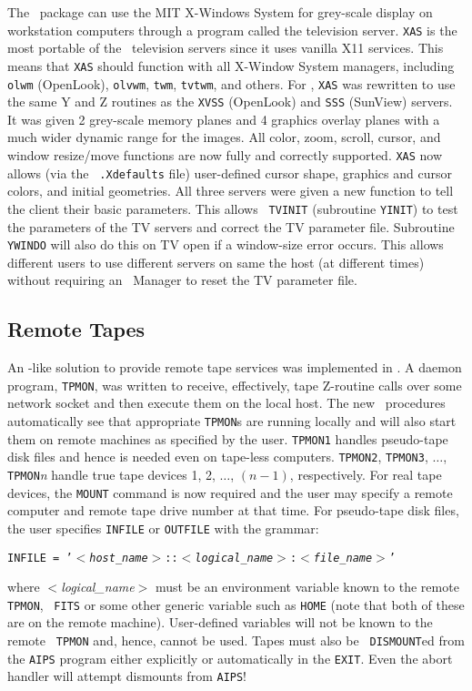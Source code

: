 The \AIPS\ package can use the MIT X-Windows System for grey-scale
display on workstation computers through a program called the
television server.  {\tt XAS} is the most portable of the \AIPS\
television servers since it uses vanilla X11 services.  This means
that {\tt XAS} should function with all X-Window System managers,
including {\tt olwm} (OpenLook), {\tt olvwm}, {\tt twm}, {\tt tvtwm},
and others.  For \RELEASENAME, {\tt XAS} was rewritten to use the same
Y and Z routines as the {\tt XVSS} (OpenLook) and {\tt SSS} (SunView)
servers.  It was given 2 grey-scale memory planes and 4 graphics
overlay planes with a much wider dynamic range for the images.  All
color, zoom, scroll, cursor, and window resize/move functions are now
fully and correctly supported.  {\tt XAS} now allows (via the {\tt
.Xdefaults} file) user-defined cursor shape, graphics and cursor
colors, and initial geometries.  All three servers were given a new
function to tell the client their basic parameters.  This allows {\tt
TVINIT} (subroutine {\tt YINIT}) to test the parameters of the TV
servers and correct the TV parameter file.  Subroutine {\tt YWINDO}
will also do this on TV open if a window-size error occurs.  This
allows different users to use different servers on same the host (at
different times) without requiring an \AIPS\ Manager to reset the
TV parameter file.

\subsection{Remote Tapes}
An \AIPS-like solution to provide remote tape services was implemented
in \RELEASENAME.  A daemon program, {\tt TPMON}, was written to
receive, effectively, tape Z-routine calls over some network socket
and then execute them on the local host.  The new \AIPS\ procedures
automatically see that appropriate {\tt TPMON}s are running locally
and will also start them on remote machines as specified by the user.
{\tt TPMON1} handles pseudo-tape disk files and hence is needed even
on tape-less computers.  {\tt TPMON2}, {\tt TPMON3}, $\ldots$, {\tt
TPMON}{\it n} handle true tape devices 1, 2, $\ldots$, $(n-1)$,
respectively.  For real tape devices, the {\tt MOUNT} command is now
required and the user may specify a remote computer and remote tape
drive number at that time.  For pseudo-tape disk files, the user
specifies {\tt INFILE} or {\tt OUTFILE} with the grammar:
\vspace{\MYSpace}
\begin{center}
{\tt INFILE =
'$<${\it host\_name}$>$::$<${\it logical\_name}$>$:$<${\it file\_name}$>$' }
\end{center}
\vspace{\MYSpace}
where $<${\it logical\_name}$>$ must be an environment variable known to
the remote {\tt TPMON}, \ie\ {\tt FITS} or some other generic variable
such as {\tt HOME} (note that both of these are on the remote
machine).  User-defined variables will not be known to the remote {\tt
TPMON} and, hence, cannot be used.  Tapes must also be {\tt
DISMOUNT}ed from the {\tt AIPS} program either explicitly or automatically
in the \hbox{{\tt EXIT}}.  Even the abort handler will attempt
dismounts from {\tt AIPS}!


